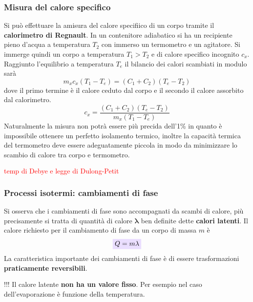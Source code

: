 \documentclass[x11names]{report}
\newcommand{\viola}[1]{\colorbox{yred}{$\displaystyle #1$}}
\begin{document}
	\subsubsection{Misura del calore specifico}
	Si può effettuare la amisura del calore specifiico di un corpo tramite il \textbf{calorimetro di Regnault}. In un contenitore adiabatico si ha un recipiente pieno d'acqua a temperatura \(T_2\) con immerso un termometro e un agitatore. Si immerge quindi un corpo a temperatura \(T_1 > T_2\) e di calore specifico incognito \(c_x\). Raggiunto l'equilibrio a temperatura \(T_e\) il bilancio dei calori scambiati in modulo sarà
	\[ 
	m_xc_x(T_1 - T_e) = (C_1 + C_2)(T_e - T_2)
	\]
	dove il primo termine è il calore ceduto dal corpo e il secondo il calore assorbito dal calorimetro.
	\[ 
	c_x = \frac{(C_1 + C_2)(T_e - T_2)}{m_x(T_1 - T_e)}
	\]
	Naturalmente la misura non potrà essere più precida dell'1\% in quanto è impossibile ottenere un perfetto isolamento termico, inoltre la capacità termica del termometro deve essere adeguatamente piccola  in modo da minimizzare lo scambio di calore tra corpo e termometro.
	
	
	\begin{center}
		\textcolor{red}{temp di Debye e legge di Dulong-Petit}
	\end{center}
	
	\subsubsection{Processi isotermi: cambiamenti di fase}
	Si osserva che i cambiamenti di fase sono accompagnati da scambi di calore, più precisamente si tratta di quantità di calore \(\boldsymbol{\lambda}\) ben definite dette  \textbf{calori latenti}. Il calore richiesto per il cambiamento di fase da un corpo di massa \(m\) è 
	\begin{equation}\label{calorelatente}
		\viola{	Q = m\lambda}
	\end{equation}
	La caratteristica importante dei cambiamenti di fase è di essere trasformazioni \textbf{praticamente reversibili}.
	
	\begin{center}
		\colorbox{attenzione}{\begin{minipage}{5.75in}
				\begin{attenzione}{!!!}
					Il calore latente \textbf{non ha un valore fisso}. Per esempio nel caso dell'evaporazione è funzione della temperatura.
				\end{attenzione}
		\end{minipage}}
	\end{center}
	
\end{document}
